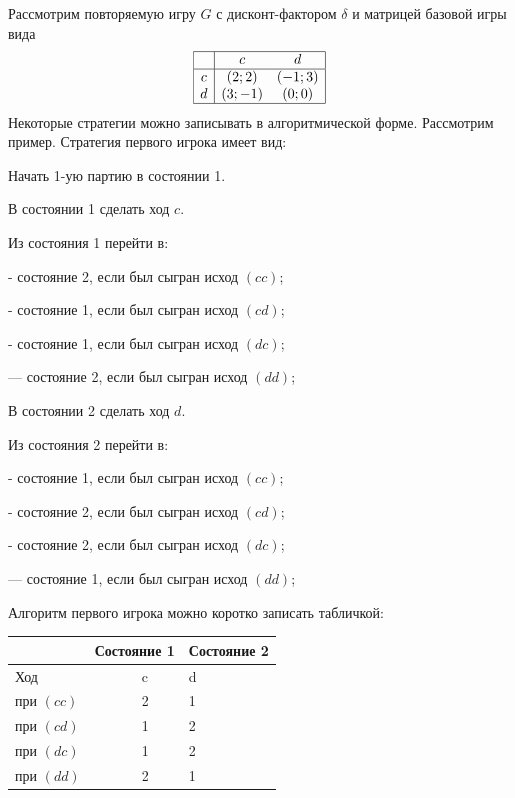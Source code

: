 \begin{problem}

Рассмотрим повторяемую игру  $G$  с дисконт-фактором  $\delta $  и матрицей базовой игры вида
\[\begin{array}{|c|cc|}  \hline {} & {c} & {d} \\  \hline {c} & {(2;2)} & {(-1;3)} \\ {d} & {(3;-1)} & {(0;0)} \\  \hline  \end{array}\]
Некоторые стратегии можно записывать в алгоритмической форме. Рассмотрим пример.
Стратегия первого игрока имеет вид:\par
Начать 1-ую партию в состоянии 1.\par
В состоянии 1 сделать ход  $c$.\par
Из состояния 1 перейти в:\par
- состояние 2, если был сыгран исход  $\left(cc\right)$;\par
- состояние 1, если был сыгран исход  $\left(cd\right)$;\par
- состояние 1, если был сыгран исход  $\left(dc\right)$;\par
       — состояние 2, если был сыгран исход  $\left(dd\right)$;\par
В состоянии 2 сделать ход  $d$.\par
Из состояния 2 перейти в:\par
- состояние 1, если был сыгран исход  $\left(cc\right)$;\par
- состояние 2, если был сыгран исход  $\left(cd\right)$;\par
- состояние 2, если был сыгран исход  $\left(dc\right)$;\par
       — состояние 1, если был сыгран исход  $\left(dd\right)$;\par
Алгоритм первого игрока можно коротко записать табличкой:


\begin{tabular} {|p{43.12pt}| p{19.60pt}| p{37.52pt}| p{19.60pt}| p{31.92pt}| } \hline
   &  \multicolumn{2}{|l|}{ Состояние 1 } &  \multicolumn{2}{|l|}{ Состояние 2 } \\ \hline
 \multicolumn{2}{|l|}{ Ход } &  \multicolumn{2}{|l|}{ c } &  d  \\ \hline
 \multicolumn{2}{|l|}{ при  $\left(cc\right)$  } &  \multicolumn{2}{|l|}{ 2 } &  1  \\ \hline
 \multicolumn{2}{|l|}{ при  $\left(cd\right)$  } &  \multicolumn{2}{|l|}{ 1 } &  2  \\ \hline
 \multicolumn{2}{|l|}{ при  $\left(dc\right)$  } &  \multicolumn{2}{|l|}{ 1 } &  2  \\ \hline
 \multicolumn{2}{|l|}{ при  $\left(dd\right)$  } &  \multicolumn{2}{|l|}{ 2 } &  1  \\ \hline
\end{tabular}


\end{problem}
